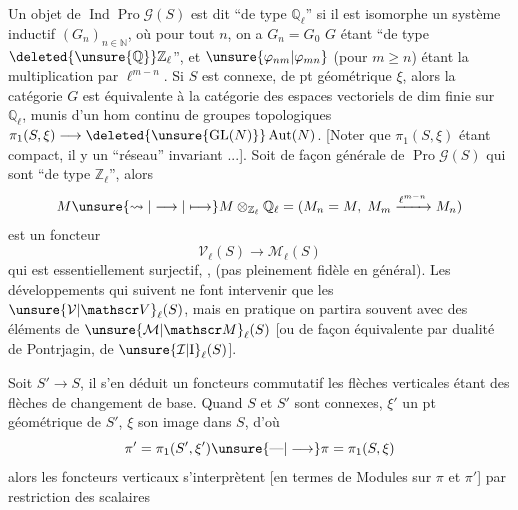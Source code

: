 Un objet de $\operatorname{Ind}\operatorname{Pro}\mathscr G(S)$ est dit
``de type $\mathbb Q_\ell$'' si il est isomorphe  un  système inductif $(G_n)_{n\in\mathbb N}$, où pour tout $n$, on a $G_n=G_0$ $G$ étant ``de type $\deleted{\unsure{\mathbb Q}}\mathbb Z_\ell$'', et $\unsure{\varphi_{nm}|\varphi_{mn}}$ (pour $m\geq n$) étant la multiplication par $\ell^{m-n}$. Si $S$ est connexe, de pt géométrique $\xi$, alors la catégorie   $G$ est équivalente à la catégorie des espaces vectoriels  de dim finie sur $\mathbb Q_\ell$, munis d'un hom continu de groupes topologiques $\pi_1(S,\xi)\longrightarrow\deleted{\unsure{\operatorname{GL}(N)}}\operatorname{Aut}(N)$. [Noter que $\pi_1(S,\xi)$ étant compact, il y  un ``réseau'' invariant ...]. Soit de façon générale   de $\operatorname{Pro}\mathscr G(S)$ qui sont ``de type $\mathbb Z_\ell$'', alors 
\[
M\unsure{\rightsquigarrow|\longrightarrow|\longmapsto}M\otimes_{\mathbb Z_\ell}\mathbb Q_\ell=(M_n=M,\;M_m\xrightarrow{\ell^{m-n}}M_n)
\]
est un foncteur
\[
\mathcal V_\ell(S)\longrightarrow\mathcal M_\ell(S)
\]
qui est essentiellement surjectif, , (pas pleinement fidèle en général). Les
développements qui suivent ne font intervenir que les $\unsure{\mathcal V|\mathscr V}_\ell(S)$, mais en pratique on partira souvent avec des éléments de $\unsure{\mathcal M|\mathscr M}_\ell(S)$ [ou de façon équivalente par dualité de Pontrjagin, de $\unsure{\mathcal I|\mathrm I}_\ell(S)$].

Soit $S'\longrightarrow S$, il s'en déduit un  foncteurs  commutatif
les flèches verticales étant des flèches de changement de base. Quand $S$ et $S'$ sont connexes, $\xi'$ un pt géométrique de $S'$, $\xi$ son image dans $S$, d'où
\[
\pi'=\pi_1(S',\xi')\unsure{\text{---}|\longrightarrow}\pi=\pi_1(S,\xi)
\]
alors les foncteurs verticaux s'interprètent [en termes de  Modules sur $\pi$ et $\pi'$] par restriction des scalaires


